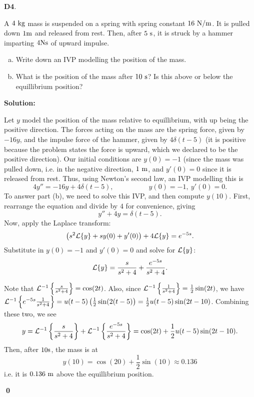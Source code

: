 \documentclass{article}
\newenvironment{problem}[1]
{
  \begin{flushleft}
  \textbf{#1}.
  \ignorespaces
}
{
  \end{flushleft}
}
\newenvironment{solution}
{
  \ignorespaces
  \textbf{Solution:}
}
{
  \ignorespacesafterend
  \begin{flushright}
  {\bfseries \qed}
  \end{flushright}
}
\begin{document}
\begin{problem}{D4}
A \(4\ {\rm kg}\) mass is suspended on a spring with spring constant \(16\ {\rm N/m}\).  It is pulled down \(1 {\rm m}\) and released from rest.  Then, after \(5\ {\rm s}\), it is struck by a hammer imparting \(4 {\rm Ns}\) of upward impulse.
\begin{enumerate}[(a)]
\item Write down an IVP modelling the position of the mass.
\item What is the position of the mass after \(10 \ {\rm s}\)?  Is this above or below the equillibrium position?
\end{enumerate}
\end{problem}
\begin{solution}
Let \(y\) model the position of the mass relative to equillibrium, with up being the positive direction.  The forces acting on the mass are the spring force, given by \(-16 y\), and the impulse force of the hammer, given by \(4 \delta(t-5)\) (it is positive because the problem states the force is upward, which we declared to be the positive direction).  Our initial conditions are \(y(0)= -1\) (since the mass was pulled down, i.e. in the negative direction, \(1\ {\rm m}\), and \(y'(0)=0\) since it is released from rest.  Thus, using Newton's second law, an IVP modelling this is
\[ 4y''=-16y+4\delta(t-5), \hspace{5em} y(0)=-1,\ y'(0)=0.\]
To answer part (b), we need to solve this IVP, and then compute \(y(10)\).  First, rearrange the equation and divide by \(4\) for convenience, giving 
\[ y'' + 4y =  \delta(t-5).\]
Now, apply the Laplace transform:
\[\left(s^2\mathcal{L}\{y\}+sy(0)+y'(0)\right)+4\mathcal{L}\{y\} = e^{-5s}.\]
Substitute in \(y(0)=-1\) and \(y'(0)=0\) and solve for \(\mathcal{L}\{y\}\):
\[\mathcal{L}\{y\} = \frac{s}{s^2+4} + \frac{e^{-5s}}{s^2+4}.\]

Note that \(\mathcal{L}^{-1}\left\{\frac{s}{s^2+4}\right\} =  \cos(2t)\).  Also, since \(\mathcal{L}^{-1} \left\{\frac{1}{s^2+4}\right\} = \frac{1}{2} \sin(2t)\), we have \(\mathcal{L}^{-1}\left\{e^{-5s} \frac{1}{s^2+4}\right\} = u(t-5) \left(\frac{1}{2} \sin(2(t-5)\right) = \frac{1}{2} u(t-5) \sin(2t-10)\).  Combining these two, we see
\[y = \mathcal{L}^{-1} \left\{\frac{s}{s^2+4}\right\}+\mathcal{L}^{-1}\left\{\frac{e^{-5s}}{s^2+4}\right\} = \cos(2t)+\frac{1}{2} u(t-5)\sin(2t-10).\]
Then, after \(10{\rm s}\), the mass is at
\[y(10)= \cos(20) + \frac{1}{2} \sin(10) \approx 0.136 \]
i.e. it is \(0.136\ {\rm m}\) above the equillibrium position.
\end{solution}
\end{document}
